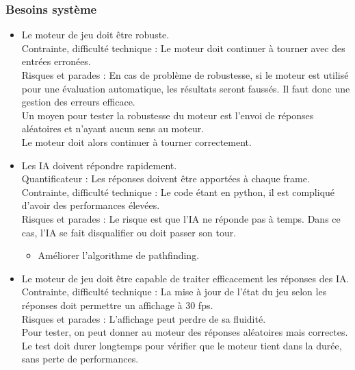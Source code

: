 \subsubsection{Besoins système}
    \begin{itemize}
        \item Le moteur de jeu doit être robuste. \\
            Contrainte, difficulté technique : Le moteur doit continuer à tourner avec des entrées erronées. \\
            Risques et parades : En cas de problème de robustesse, si le moteur est utilisé pour une évaluation automatique, les résultats seront faussés. Il faut donc une gestion des erreurs efficace.\\
            Un moyen pour tester la robustesse du moteur est l'envoi de réponses aléatoires et n'ayant aucun sens au moteur.\\
            Le moteur doit alors continuer à tourner correctement.\\

        \item Les IA doivent répondre rapidement.\\
            Quantificateur : Les réponses doivent être apportées à chaque frame.\\
            Contrainte, difficulté technique : Le code étant en python, il est compliqué d'avoir des performances élevées.\\
            Risques et parades : Le risque est que l'IA ne réponde pas à temps. Dans ce cas, l'IA se fait disqualifier ou doit passer son tour.\\
            \begin{itemize}
                \item Améliorer l'algorithme de pathfinding.
            \end{itemize}
        
        \item Le moteur de jeu doit être capable de traiter efficacement les réponses des IA.\\
            Contrainte, difficulté technique :  La mise à jour de l'état du jeu selon les réponses doit permettre un affichage à 30 fps.\\
            Risques et parades : L'affichage peut perdre de sa fluidité.\\
            Pour tester, on peut donner au moteur des réponses aléatoires mais correctes. Le test doit durer longtemps pour vérifier que le moteur tient dans la durée, sans perte de performances.\\
        
    \end{itemize}
    

